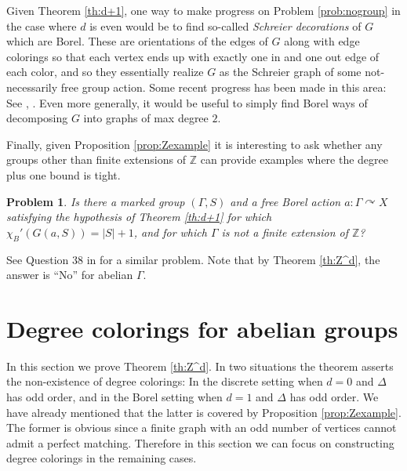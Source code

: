 \documentclass[12pt]{article}
\newcommand{\0}{\varnothing}
\newcommand{\Z}{\mathbb{Z}}
\newtheorem{prob}{Problem}
\begin{document}
Given Theorem \ref{th:d+1}, one way to make progress on Problem \ref{prob:nogroup} in the case where $d$ is even would be to find  so-called \textit{Schreier decorations} of $G$ which are Borel. These are orientations of the edges of $G$ along with edge colorings so that each vertex ends up with exactly one in and one out edge of each color, and so they essentially realize $G$ as the Schreier graph of some not-necessarily free group action. Some recent progress has been made in this area: See \cite{T21}, \cite{BHT}. Even more generally, it would be useful to simply find Borel ways of decomposing $G$ into graphs of max degree $2$.

Finally, given Proposition \ref{prop:Zexample} it is interesting to ask whether any groups other than finite extensions of $\Z$ can provide examples where the degree plus one bound is tight. 

\begin{prob}
Is there a marked group $(\Gamma,S)$ and a free Borel action $a:\Gamma \curvearrowright X$ satisfying the hypothesis of Theorem \ref{th:d+1} for which $\chi_B'(G(a,S)) = |S|+1$, and for which $\Gamma$ is not a finite extension of $\Z$? 
\end{prob}

See Question 38 in \cite{BHT} for a similar problem. Note that by Theorem \ref{th:Z^d}, the answer is ``No'' for abelian $\Gamma$.


\section{Degree colorings for abelian groups}\label{sec:Z^d}


In this section we prove Theorem \ref{th:Z^d}. In two situations the theorem asserts the non-existence of degree colorings: In the discrete setting when $d = 0$ and $\Delta$ has odd order, and in the Borel setting when $d = 1$ and $\Delta$ has odd order. We have already mentioned that the latter is covered by Proposition \ref{prop:Zexample}. The former is obvious since a finite graph with an odd number of vertices cannot admit a perfect matching. Therefore in this section we can focus on constructing degree colorings in the remaining cases.
\end{document}
